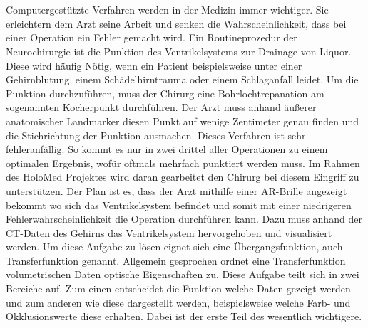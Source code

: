 \chapter{}
\label{sec:Introduction}



Computergestützte Verfahren werden in der Medizin immer wichtiger. Sie erleichtern dem Arzt seine Arbeit und senken die Wahrscheinlichkeit, dass bei einer Operation ein Fehler gemacht wird.
\newline
{}
Ein Routineprozedur der Neurochirurgie ist die Punktion des Ventrikelsystems zur Drainage von Liquor. Diese wird häufig Nötig, wenn ein Patient beispielsweise unter einer Gehirnblutung, einem Schädelhirntrauma oder einem Schlaganfall leidet. Um die Punktion durchzuführen, muss der Chirurg eine Bohrlochtrepanation am sogenannten Kocherpunkt durchführen. Der Arzt muss anhand äußerer anatomischer Landmarker diesen Punkt auf wenige Zentimeter genau finden und die Stichrichtung der Punktion ausmachen. Dieses Verfahren ist sehr fehleranfällig. So kommt es nur in zwei drittel aller Operationen zu einem optimalen Ergebnis, wofür oftmals mehrfach punktiert werden muss.
\newline
Im Rahmen des HoloMed Projektes wird daran gearbeitet den Chirurg bei diesem Eingriff zu unterstützen. Der Plan ist es, dass der Arzt mithilfe einer AR-Brille angezeigt bekommt wo sich das Ventrikelsystem befindet und somit mit einer niedrigeren Fehlerwahrscheinlichkeit die Operation durchführen kann.
\newline
Dazu muss anhand der CT-Daten des Gehirns das Ventrikelsystem hervorgehoben und visualisiert werden. Um diese Aufgabe zu lösen eignet sich eine Übergangsfunktion, auch Transferfunktion genannt. Allgemein gesprochen ordnet eine Transferfunktion volumetrischen Daten optische Eigenschaften zu. Diese Aufgabe teilt sich in zwei Bereiche auf. Zum einen entscheidet die Funktion welche Daten gezeigt werden und zum anderen wie diese dargestellt werden, beispielsweise welche Farb- und Okklusionswerte diese erhalten. Dabei ist der erste Teil des wesentlich wichtigere.
\newline


























